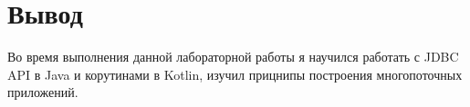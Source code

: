 \section{Вывод}
Во время выполнения данной лабораторной работы я научился
работать с JDBC API в Java и корутинами в Kotlin, изучил прицнипы
построения многопоточных приложений.
